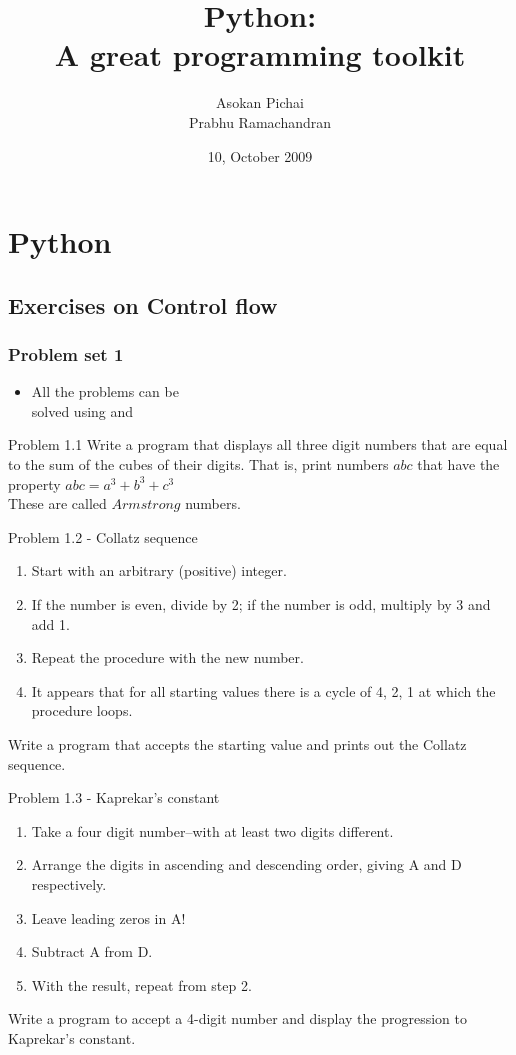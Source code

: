 \documentclass[14pt,compress]{beamer}
\title[Basic Python]{Python:\\A great programming toolkit}
\author[Asokan \& Prabhu] {Asokan Pichai\\Prabhu Ramachandran}
\institute[IIT Bombay] {Department of Aerospace Engineering\\IIT Bombay}
\date[] {10, October 2009}
\newcommand{\kwrd}[1]{ \texttt{\textbf{\color{blue}{#1}}}  }
\begin{document}
\begin{frame}
  \titlepage
\end{frame}

\section{Python}

\subsection{Exercises on Control flow}
\begin{frame}
  \frametitle{Problem set 1}
  \begin{itemize}
    \item All the problems can be\\
      solved using \kwrd{if} and \kwrd{while} 
  \end{itemize}
\end{frame}

\begin{frame}{Problem 1.1}
  Write a program that displays all three digit numbers that are equal to the sum of the cubes of their digits. That is, print numbers $abc$ that have the property $abc = a^3 + b^3 + c^3$\\
These are called $Armstrong$ numbers.
\end{frame}
  
\begin{frame}{Problem 1.2 - Collatz sequence}
\begin{enumerate}
  \item Start with an arbitrary (positive) integer. 
  \item If the number is even, divide by 2; if the number is odd, multiply by 3 and add 1.
  \item Repeat the procedure with the new number.
  \item It appears that for all starting values there is a cycle of 4, 2, 1 at which the procedure loops.
\end{enumerate}
    Write a program that accepts the starting value and prints out the Collatz sequence.

\end{frame}

\begin{frame}{Problem 1.3 - Kaprekar's constant}
  \begin{enumerate}
    \item Take a four digit number--with at least two digits different.
    \item Arrange the digits in ascending and descending order, giving A and D respectively.
    \item Leave leading zeros in A!
    \item Subtract A from D.
    \item With the result, repeat from step 2.
  \end{enumerate}
  Write a program to accept a 4-digit number and display the progression to Kaprekar's constant.
\end{frame}
\end{document}

